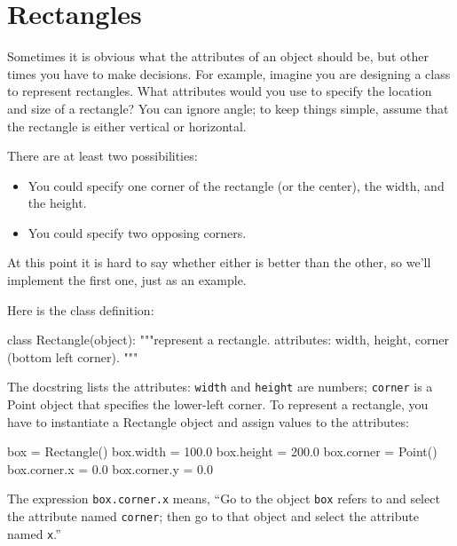 \section{Rectangles}

Sometimes it is obvious what the attributes of an object should be,
but other times you have to make decisions.  For example, imagine you
are designing a class to represent rectangles.  What attributes would
you use to specify the location and size of a rectangle?  You can
ignore angle; to keep things simple, assume that the rectangle is
either vertical or horizontal.


There are at least two possibilities: 

\begin{itemize}

\item You could specify one corner of the rectangle
(or the center), the width, and the height.

\item You could specify two opposing corners.

\end{itemize}

At this point it is hard to say whether either is better than
the other, so we'll implement the first one, just as an example.


Here is the class definition:

\beforeverb
\begin{pycode}
class Rectangle(object):
    """represent a rectangle. 
       attributes: width, height, corner (bottom left corner).
    """
\end{pycode}
\afterverb
%
The docstring lists the attributes:  {\tt width} and
{\tt height} are numbers; {\tt corner} is a Point object that
specifies the lower-left corner.
%
To represent a rectangle, you have to instantiate a Rectangle
object and assign values to the attributes:

\beforeverb
\begin{pycode}
box = Rectangle()
box.width = 100.0
box.height = 200.0
box.corner = Point()
box.corner.x = 0.0
box.corner.y = 0.0
\end{pycode}
\afterverb
%
The expression {\tt box.corner.x} means,
``Go to the object {\tt box} refers to and select the attribute named
{\tt corner}; then go to that object and select the attribute named
{\tt x}.''

